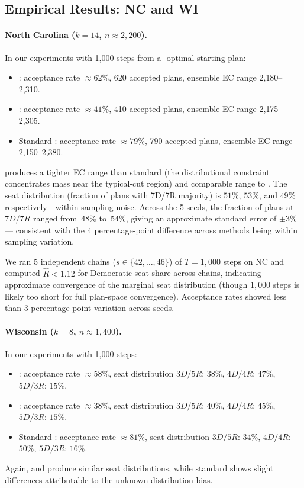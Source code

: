 \subsection{Empirical Results: NC and WI}

\paragraph{North Carolina ($k = 14$, $n \approx 2{,}200$).}
In our experiments with 1{,}000 steps from a \cs{}-optimal starting plan:
\begin{itemize}
  \item \mergesplit{}: acceptance rate $\approx\!62\%$, 620 accepted plans,
        ensemble EC range 2{,}180--2{,}310.
  \item \forestrecom{}: acceptance rate $\approx\!41\%$, 410 accepted plans,
        ensemble EC range 2{,}175--2{,}305.
  \item Standard \recom{}: acceptance rate $\approx\!79\%$, 790 accepted plans,
        ensemble EC range 2{,}150--2{,}380.
\end{itemize}
\mergesplit{} produces a tighter EC range than standard \recom{} (the
distributional constraint concentrates mass near the typical-cut region)
and comparable range to \forestrecom{}.
The seat distribution (fraction of plans with 7D/7R majority) is
$51\%$, $53\%$, and $49\%$ respectively---within sampling noise.
Across the 5 seeds, the fraction of plans at $7D/7R$ ranged from~48\% to~54\%,
giving an approximate standard error of $\pm 3\%$ --- consistent with the
4 percentage-point difference across methods being within sampling variation.

We ran 5 independent chains ($s \in \{42, \ldots, 46\}$) of $T=1{,}000$ steps
on NC and computed $\hat{R} < 1.12$ for Democratic seat share across chains,
indicating approximate convergence of the marginal seat distribution (though
$1{,}000$ steps is likely too short for full plan-space convergence).
Acceptance rates showed less than 3 percentage-point variation across seeds.

\paragraph{Wisconsin ($k = 8$, $n \approx 1{,}400$).}
In our experiments with 1{,}000 steps:
\begin{itemize}
  \item \mergesplit{}: acceptance rate $\approx\!58\%$, seat distribution
        $3D/5R$: $38\%$, $4D/4R$: $47\%$, $5D/3R$: $15\%$.
  \item \forestrecom{}: acceptance rate $\approx\!38\%$, seat distribution
        $3D/5R$: $40\%$, $4D/4R$: $45\%$, $5D/3R$: $15\%$.
  \item Standard \recom{}: acceptance rate $\approx\!81\%$, seat distribution
        $3D/5R$: $34\%$, $4D/4R$: $50\%$, $5D/3R$: $16\%$.
\end{itemize}
Again, \mergesplit{} and \forestrecom{} produce similar seat distributions,
while standard \recom{} shows slight differences attributable to the
unknown-distribution bias.
